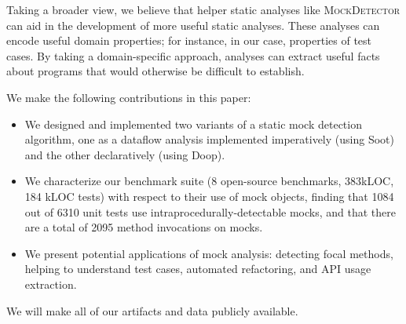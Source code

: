 Taking a broader view, we believe that helper static analyses like \textsc{MockDetector} 
can aid
in the development of more useful static analyses. These analyses can
encode useful domain properties; for instance, in our case, properties
of test cases. By taking a domain-specific approach, analyses can extract
useful facts about programs that would otherwise be difficult to establish.

We make the following contributions in this paper:
\begin{itemize}
\item We designed and implemented two variants of a static mock detection algorithm, one as a dataflow analysis implemented imperatively (using Soot) and the other declaratively (using Doop).
\item We characterize our benchmark suite (8 open-source benchmarks, 383kLOC, 184 kLOC tests) with respect to their use of mock objects, finding that 1084 out of 6310 unit tests use intraprocedurally-detectable mocks, and that there are a total of 2095 method invocations on mocks. %
\item We present potential applications of mock analysis: detecting focal methods, helping to understand test cases, automated refactoring, and API usage extraction.
\end{itemize}

We will make all of our artifacts and data publicly available.

